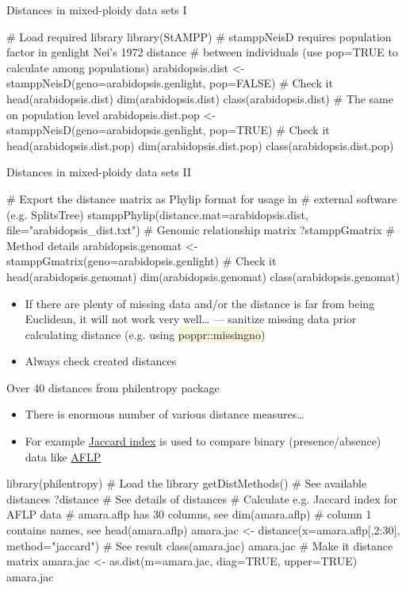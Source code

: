 \documentclass[compress, ucs, xelatex, 11pt, xcolor=svgnames, aspectratio=169,
	hyperref={
		bookmarks=true,
		unicode=true,
		colorlinks=true,
		pdftitle={Molecular data in R},
		plainpages=false,
		pdfauthor={Vojtech Zeisek},
		pdfsubject={Course about phylogeny and evolution in R},
		pdfcreator={XeLaTeX},
		pdfkeywords={R, evolution, phylogeny, molecular data},
		linkcolor=Crimson, %
		anchorcolor=Magenta, %
		citecolor=Magenta, %
		filecolor=Magenta, %
		menucolor=Magenta, %
		urlcolor=DodgerBlue, %
		pdftex},
	url={hyphens, lowtilde} %
	]{beamer}
\renewcommand{\texttt}[1]{\colorbox{Beige}{{\ttfamily #1}}}
\begin{document}
\begin{frame}[fragile]{Distances in mixed-ploidy data sets I}
	\begin{spluscode}
    # Load required library
    library(StAMPP)
    # stamppNeisD requires population factor in genlight Nei's 1972 distance
    # between individuals (use pop=TRUE to calculate among populations)
    arabidopsis.dist <- stamppNeisD(geno=arabidopsis.genlight, pop=FALSE)
    # Check it
    head(arabidopsis.dist)
    dim(arabidopsis.dist)
    class(arabidopsis.dist)
    # The same on population level
    arabidopsis.dist.pop <- stamppNeisD(geno=arabidopsis.genlight, pop=TRUE)
    # Check it
    head(arabidopsis.dist.pop)
    dim(arabidopsis.dist.pop)
    class(arabidopsis.dist.pop)
	\end{spluscode}
\end{frame}

\begin{frame}[fragile]{Distances in mixed-ploidy data sets II}
	\begin{spluscode}
    # Export the distance matrix as Phylip format for usage in
    # external software (e.g. SplitsTree)
    stamppPhylip(distance.mat=arabidopsis.dist, file="arabidopsis_dist.txt")
    # Genomic relationship matrix
    ?stamppGmatrix # Method details
    arabidopsis.genomat <- stamppGmatrix(geno=arabidopsis.genlight)
    # Check it
    head(arabidopsis.genomat)
    dim(arabidopsis.genomat)
    class(arabidopsis.genomat)
	\end{spluscode}
	\begin{itemize}
		\item If there are plenty of missing data and/or the distance is far from being Euclidean, it will not work very well\ldots{ } --- sanitize missing data prior calculating distance (e.g. using \texttt{poppr::missingno})
		\item Always check created distances
	\end{itemize}
\end{frame}

\begin{frame}[fragile]{Over 40 distances from philentropy package}
	\begin{itemize}
		\item There is enormous number of various distance measures\ldots
		\item For example \href{https://en.wikipedia.org/wiki/Jaccard_index}{Jaccard index} is used to compare binary (presence/absence) data like \href{https://en.wikipedia.org/wiki/Amplified_fragment_length_polymorphism}{AFLP}
	\end{itemize}
	\begin{spluscode}
    library(philentropy) # Load the library
    getDistMethods() # See available distances
    ?distance # See details of distances
    # Calculate e.g. Jaccard index for AFLP data
    # amara.aflp has 30 columns, see dim(amara.aflp)
    # column 1 contains names, see head(amara.aflp)
    amara.jac <- distance(x=amara.aflp[,2:30], method="jaccard")
    # See result
    class(amara.jac)
    amara.jac
    # Make it distance matrix
    amara.jac <- as.dist(m=amara.jac, diag=TRUE, upper=TRUE)
    amara.jac
	\end{spluscode}
\end{frame}
\end{document}
